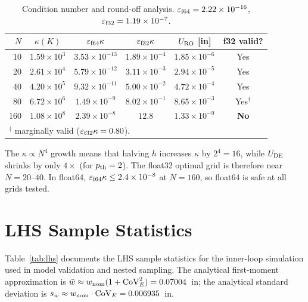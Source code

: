 \documentclass[10pt,twocolumn]{article}
\begin{document}
\begin{table}[h!]
\centering
\caption{Condition number and round-off analysis.
  $\varepsilon_{\rm f64}=2.22\times10^{-16}$,
  $\varepsilon_{\rm f32}=1.19\times10^{-7}$.}
\label{tab:roundoff}
\footnotesize
\setlength{\tabcolsep}{2pt}
\begin{tabular}{@{}rccccc@{}}
\toprule
$N$ & $\kappa(K)$ & $\varepsilon_{\rm f64}\kappa$ & $\varepsilon_{\rm f32}\kappa$ &
  $U_{\rm RO}$ [in] & f32 valid?\\
\midrule
 10 & $1.59{\times}10^{3}$ & $3.53{\times}10^{-13}$ & $1.89{\times}10^{-4}$ & $1.85{\times}10^{-6}$ & Yes\\
 20 & $2.61{\times}10^{4}$ & $5.79{\times}10^{-12}$ & $3.11{\times}10^{-3}$ & $2.94{\times}10^{-5}$ & Yes\\
 40 & $4.20{\times}10^{5}$ & $9.32{\times}10^{-11}$ & $5.00{\times}10^{-2}$ & $4.72{\times}10^{-4}$ & Yes\\
 80 & $6.72{\times}10^{6}$ & $1.49{\times}10^{-9}$  & $8.02{\times}10^{-1}$ & $8.65{\times}10^{-3}$ & Yes$^\dagger$\\
160 & $1.08{\times}10^{8}$ & $2.39{\times}10^{-8}$  & $12.8$                & $1.33{\times}10^{-9}$ & \textbf{No}\\
\bottomrule
\multicolumn{6}{l}{$^\dagger$ marginally valid ($\varepsilon_{\rm f32}\kappa=0.80$).}
\end{tabular}
\end{table}

The $\kappa\propto N^4$ growth means that halving $h$ increases $\kappa$ by
$2^4=16$, while $U_{\rm DE}$ shrinks by only $4\times$ (for $p_{\rm th}=2$).
The float32 optimal grid is therefore near $N=20$--$40$.
In float64, $\varepsilon_{\rm f64}\kappa\le2.4\times10^{-8}$ at $N=160$,
so float64 is safe at all grids tested.

\section{LHS Sample Statistics}
\label{app:lhs}

Table~\ref{tab:lhs} documents the LHS sample statistics for the
inner-loop simulation used in model validation and nested sampling.
The analytical first-moment approximation is
$\bar{w}\approx w_{\rm nom}(1+{\rm CoV}_E^2)=0.07004$~in;
the analytical standard deviation is
$s_w\approx w_{\rm nom}\cdot{\rm CoV}_E=0.006935$~in.
\end{document}
